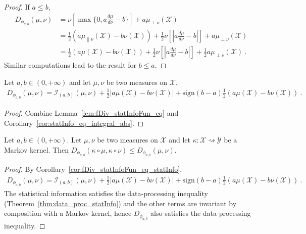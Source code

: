 \begin{proof}\leanok
\uses{}
If $a \le b$,
\begin{align*}
D_{\phi_{a,b}}(\mu, \nu)
&= \nu\left[ \max\{0, a \frac{d\mu}{d\nu} - b\} \right] + a \mu_{\perp \nu}(\mathcal X)
\\
&= \frac{1}{2}(a \mu_{\parallel \nu}(\mathcal X) - b \nu(\mathcal X)) + \frac{1}{2}\nu\left[ \left\vert a \frac{d\mu}{d\nu} - b \right\vert \right] + a \mu_{\perp \nu}(\mathcal X)
\\
&= \frac{1}{2}(a \mu(\mathcal X) - b \nu(\mathcal X)) + \frac{1}{2}\nu\left[ \left\vert a \frac{d\mu}{d\nu} - b \right\vert \right] + \frac{1}{2}a \mu_{\perp \nu}(\mathcal X)
\: . 
\end{align*}
Similar computations lead to the result for $b \le a$.
\end{proof}

\begin{corollary}
  \label{cor:fDiv_statInfoFun_eq_statInfo}
  \leanok
  Let $a,b \in (0, +\infty)$ and let $\mu, \nu$ be two measures on $\mathcal X$.
  \begin{align*}
  D_{\phi_{a,b}}(\mu, \nu) = \mathcal I_{(a,b)}(\mu, \nu) + \frac{1}{2} \left\vert a \mu(\mathcal X) - b \nu(\mathcal X) \right\vert + \text{sign}(b-a)\frac{1}{2}(a \mu(\mathcal X) - b \nu(\mathcal X))
  \: .
  \end{align*}
\end{corollary}

\begin{proof}\leanok
{}
Combine Lemma~\ref{lem:fDiv_statInfoFun_eq} and Corollary~\ref{cor:statInfo_eq_integral_abs}.
\end{proof}

\begin{lemma}
  \label{lem:fDiv_phi_data_proc}
  Let $a,b \in (0, +\infty)$. Let $\mu, \nu$ be two measures on $\mathcal X$ and let $\kappa : \mathcal X \rightsquigarrow \mathcal Y$ be a Markov kernel.
  Then $D_{\phi_{a,b}}(\kappa \circ \mu, \kappa \circ \nu) \le D_{\phi_{a,b}}(\mu, \nu)$.
\end{lemma}

\begin{proof}%
{}
By Corollary~\ref{cor:fDiv_statInfoFun_eq_statInfo},
\begin{align*}
D_{\phi_{a,b}}(\mu, \nu) = \mathcal I_{(a,b)}(\mu, \nu) + \frac{1}{2} \left\vert a \mu(\mathcal X) - b \nu(\mathcal X) \right\vert + \text{sign}(b-a)\frac{1}{2}(a \mu(\mathcal X) - b \nu(\mathcal X))
\: .
\end{align*}
The statistical information satisfies the data-processing inequality (Theorem~\ref{thm:data_proc_statInfo}) and the other terms are invariant by composition with a Markov kernel, hence $D_{\phi_{a,b}}$ also satisfies the data-processing inequality.
\end{proof}

